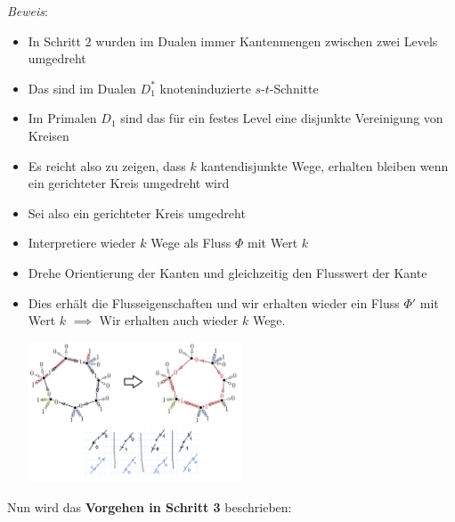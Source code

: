 \textit{Beweis}:
\begin{itemize}
	\item In Schritt 2 wurden im Dualen immer Kantenmengen zwischen zwei Levels umgedreht
	\item Das sind im Dualen $D_1^*$ knoteninduzierte $s$-$t$-Schnitte
	\item Im Primalen $D_1$ sind das für ein festes Level eine disjunkte Vereinigung von Kreisen
	\item Es reicht also zu zeigen, dass $k$ kantendisjunkte Wege, erhalten bleiben wenn ein gerichteter Kreis umgedreht wird
	\item Sei also ein gerichteter Kreis umgedreht
	\item Interpretiere wieder $k$ Wege als Fluss $\Phi$ mit Wert $k$
	\item Drehe Orientierung der Kanten und gleichzeitig den Flusswert der Kante
	\item Dies erhält die Flusseigenschaften und wir erhalten wieder ein Fluss $\Phi'$ mit Wert $k$ $\implies$ Wir erhalten auch wieder $k$ Wege.
	\begin{center}
		\includegraphics[width=0.5\textwidth]{images/menger-5.png}
	\end{center}
\end{itemize}
\bigskip
Nun wird das \textbf{Vorgehen in Schritt 3} beschrieben:
